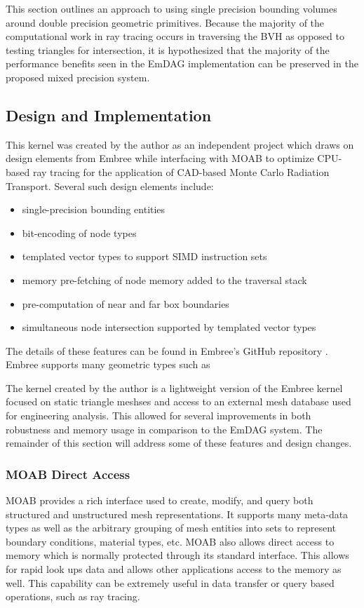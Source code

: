 This section outlines an approach to using single precision bounding volumes
around double precision geometric primitives. Because the majority of the
computational work in ray tracing occurs in traversing the BVH as opposed to
testing triangles for intersection, it is hypothesized that the majority of the
performance benefits seen in the EmDAG implementation can be preserved in the
proposed mixed precision system.

\subsection{Design and Implementation}

This kernel was created by the author as an independent project which draws on
design elements from Embree while interfacing with MOAB to optimize CPU-based
ray tracing for the application of CAD-based Monte Carlo Radiation
Transport. Several such design elements include:

\begin{itemize}
  \item single-precision bounding entities
  \item bit-encoding of node types
  \item templated vector types to support SIMD instruction sets
  \item memory pre-fetching of node memory added to the traversal stack
  \item pre-computation of near and far box boundaries
  \item simultaneous node intersection supported by templated vector types
\end{itemize}

The details of these features can be found in Embree's GitHub repository
\cite{Embree}. Embree supports many geometric types such as 

The kernel created by the author is a lightweight version of the
Embree kernel focused on static triangle meshses and access to an external mesh
database used for engineering analysis. This allowed for several improvements in
both robustness and memory usage in comparison to the EmDAG system. The
remainder of this section will address some of these features and design
changes.

\subsubsection{MOAB Direct Access}

MOAB provides a rich interface used to create, modify, and query both structured
and unstructured mesh representations. It supports many meta-data types as well as
the arbitrary grouping of mesh entities into sets to represent boundary
conditions, material types, etc. MOAB also allows direct access to memory which
is normally protected through its standard interface. This allows for rapid look
ups data and allows other applications access to the memory as well. This
capability can be extremely useful in data transfer or query based operations,
such as ray tracing.


